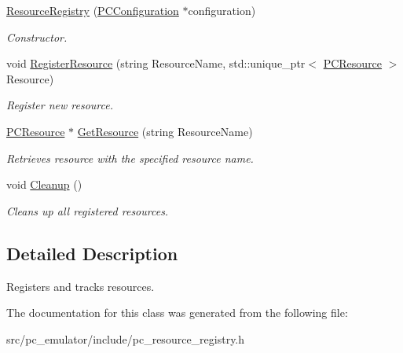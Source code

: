 \begin{DoxyCompactItemize}
\item 
\hyperlink{classpc__emulator_1_1ResourceRegistry_ae3ae928fd560cd39f3d8de651fa3797c}{Resource\+Registry} (\hyperlink{classpc__emulator_1_1PCConfiguration}{P\+C\+Configuration} $\ast$configuration)\hypertarget{classpc__emulator_1_1ResourceRegistry_ae3ae928fd560cd39f3d8de651fa3797c}{}\label{classpc__emulator_1_1ResourceRegistry_ae3ae928fd560cd39f3d8de651fa3797c}

\begin{DoxyCompactList}\small\item\em Constructor. \end{DoxyCompactList}\item 
void \hyperlink{classpc__emulator_1_1ResourceRegistry_a2e26433e14ffcf9c9f02621474465f80}{Register\+Resource} (string Resource\+Name, std\+::unique\+\_\+ptr$<$ \hyperlink{classpc__emulator_1_1PCResource}{P\+C\+Resource} $>$ Resource)\hypertarget{classpc__emulator_1_1ResourceRegistry_a2e26433e14ffcf9c9f02621474465f80}{}\label{classpc__emulator_1_1ResourceRegistry_a2e26433e14ffcf9c9f02621474465f80}

\begin{DoxyCompactList}\small\item\em Register new resource. \end{DoxyCompactList}\item 
\hyperlink{classpc__emulator_1_1PCResource}{P\+C\+Resource} $\ast$ \hyperlink{classpc__emulator_1_1ResourceRegistry_a85b83987a466f599b1129371d6650af9}{Get\+Resource} (string Resource\+Name)\hypertarget{classpc__emulator_1_1ResourceRegistry_a85b83987a466f599b1129371d6650af9}{}\label{classpc__emulator_1_1ResourceRegistry_a85b83987a466f599b1129371d6650af9}

\begin{DoxyCompactList}\small\item\em Retrieves resource with the specified resource name. \end{DoxyCompactList}\item 
void \hyperlink{classpc__emulator_1_1ResourceRegistry_afdee40d0a3d80f5b6eb36025d887e20f}{Cleanup} ()\hypertarget{classpc__emulator_1_1ResourceRegistry_afdee40d0a3d80f5b6eb36025d887e20f}{}\label{classpc__emulator_1_1ResourceRegistry_afdee40d0a3d80f5b6eb36025d887e20f}

\begin{DoxyCompactList}\small\item\em Clean\textquotesingle{}s up all registered resources. \end{DoxyCompactList}\end{DoxyCompactItemize}


\subsection{Detailed Description}
Registers and tracks resources. 

The documentation for this class was generated from the following file\+:\begin{DoxyCompactItemize}
\item 
src/pc\+\_\+emulator/include/pc\+\_\+resource\+\_\+registry.\+h\end{DoxyCompactItemize}

